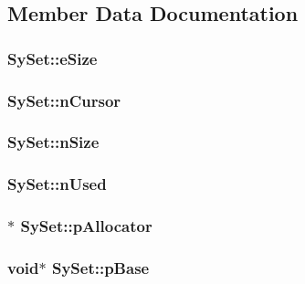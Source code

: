 \subsection{Member Data Documentation}
\hypertarget{struct_sy_set_a480bd3201e3292ec48e7c463377eaeb7}{
\subsubsection[{e\-Size}]{ Sy\-Set\-::e\-Size}}\label{da/d82/struct_sy_set_a480bd3201e3292ec48e7c463377eaeb7}
\hypertarget{struct_sy_set_a4e6034f73e0868f9334a7e418f3f2ac0}{
\subsubsection[{n\-Cursor}]{ Sy\-Set\-::n\-Cursor}}\label{da/d82/struct_sy_set_a4e6034f73e0868f9334a7e418f3f2ac0}
\hypertarget{struct_sy_set_a623c0c0fd8fa8a4ae28876bbf5f0a943}{
\subsubsection[{n\-Size}]{ Sy\-Set\-::n\-Size}}\label{da/d82/struct_sy_set_a623c0c0fd8fa8a4ae28876bbf5f0a943}
\hypertarget{struct_sy_set_a88226c604c945535566623fc1a648238}{
\subsubsection[{n\-Used}]{ Sy\-Set\-::n\-Used}}\label{da/d82/struct_sy_set_a88226c604c945535566623fc1a648238}
\hypertarget{struct_sy_set_ad5bb2614abb99d3c2d02829e5ebe86ac}{
\subsubsection[{p\-Allocator}]{$\ast$ Sy\-Set\-::p\-Allocator}}\label{da/d82/struct_sy_set_ad5bb2614abb99d3c2d02829e5ebe86ac}
\hypertarget{struct_sy_set_a4714357de27c72d90094b9c2038f3e54}{
\subsubsection[{p\-Base}]{\setlength{\rightskip}{0pt plus 5cm}void$\ast$ Sy\-Set\-::p\-Base}}\label{da/d82/struct_sy_set_a4714357de27c72d90094b9c2038f3e54}
